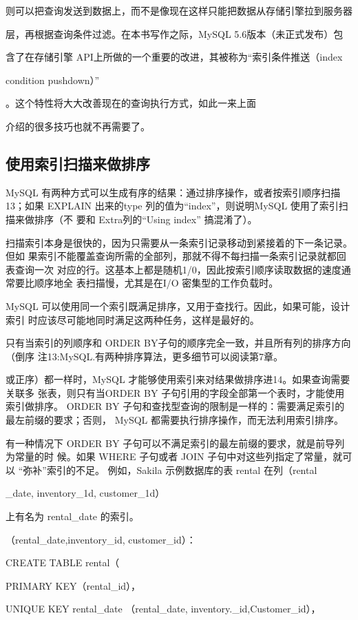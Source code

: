 则可以把查询发送到数据上，而不是像现在这样只能把数据从存储引擎拉到服务器

层，再根据查询条件过滤。在本书写作之际，MySQL 5.6版本（未正式发布）包

含了在存储引擎 API上所做的一个重要的改进，其被称为“索引条件推送（index

condition pushdown）”

。这个特性将大大改善现在的查询执行方式，如此一来上面

介绍的很多技巧也就不再需要了。

\subsection{使用索引扫描来做排序}
MySQL 有两种方式可以生成有序的结果：通过排序操作，或者按索引顺序扫描13；如果
EXPLAIN 出来的type 列的值为“index”，则说明MySQL 使用了索引扫描来做排序（不
要和 Extra列的“Using index” 搞混淆了）。

扫描索引本身是很快的，因为只需要从一条索引记录移动到紧接着的下一条记录。但如
果索引不能覆盖查询所需的全部列，那就不得不每扫描一条索引记录就都回表查询一次
对应的行。这基本上都是随机1/0，因此按索引顺序读取数据的速度通常要比顺序地全
表扫描慢，尤其是在I/O 密集型的工作负载时。

MySQL 可以使用同一个索引既满足排序，又用于查找行。因此，如果可能，设计索引
时应该尽可能地同时满足这两种任务，这样是最好的。

只有当索引的列顺序和 ORDER BY子句的顺序完全一致，并且所有列的排序方向（倒序
注13:MySQL.有两种排序算法，更多细节可以阅读第7章。

或正序）都一样时，MySQL 才能够使用索引来对结果做排序进14。如果查询需要关联多
张表，则只有当ORDER BY 子句引用的字段全部第一个表时，才能使用索引做排序。
ORDER BY 子句和查找型查询的限制是一样的：需要满足索引的最左前缀的要求；否则，
MySQL 都需要执行排序操作，而无法利用索引排序。

有一种情况下 ORDER BY 子句可以不满足索引的最左前缀的要求，就是前导列为常量的时
候。如果 WHERE 子句或者 JOIN 子句中对这些列指定了常量，就可以 “弥补”索引的不足。
例如，Sakila 示例数据库的表 rental 在列（rental

\_date, inventory\_1d, customer\_1d）

上有名为 rental\_date 的索引。

（rental\_date,inventory\_id, customer\_id）：

CREATE TABLE rental（

PRIMARY KEY（rental\_id），

UNIQUE KEY rental\_date （rental\_date, inventory.\_id,Customer\_id），


